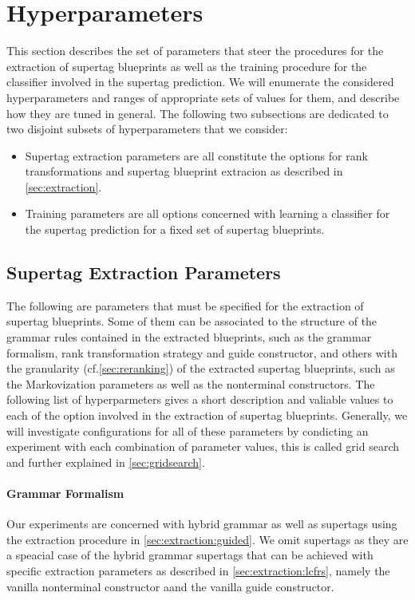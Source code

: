 \documentclass[../../document.tex]{subfiles}
\begin{document}
    \section{Hyperparameters}
    This section describes the set of parameters that steer the procedures for the extraction of supertag blueprints as well as the training procedure for the classifier involved in the supertag prediction.
    We will enumerate the considered hyperparameters and ranges of appropriate sets of values for them, and describe how they are tuned in general.
    The following two subsections are dedicated to two disjoint subsets of hyperparameters that we consider:
    \begin{itemize}
        \item Supertag extraction parameters are all constitute the options for rank transformations and supertag blueprint extracion as described in \cref{sec:extraction}.
        \item Training parameters are all options concerned with learning a classifier for the supertag prediction for a fixed set of supertag blueprints.
    \end{itemize}

    \subsection{Supertag Extraction Parameters}
    The following are parameters that must be specified for the extraction of supertag blueprints.
    Some of them can be associated to the structure of the grammar rules contained in the extracted blueprints, such as the grammar formalism, rank transformation strategy and guide constructor, and others with the granularity (cf.\@ \cref{sec:reranking}) of the extracted supertag blueprints, such as the Markovization parameters as well as the nonterminal constructors.
    The following list of hyperparmeters gives a short description and valiable values to each of the option involved in the extraction of supertag blueprints.
    Generally, we will investigate configurations for all of these parameters by condicting an experiment with each combination of parameter values, this is called grid search and further explained in \cref{sec:gridsearch}.
    
    \paragraph*{Grammar Formalism}
    Our experiments are concerned with hybrid grammar as well as  supertags using the extraction procedure in \cref{sec:extraction:guided}.
    We omit  supertags as they are a speacial case of the hybrid grammar supertags that can be achieved with specific extraction parameters as described in \cref{sec:extraction:lcfrs}, namely the vanilla nonterminal constructor aand the vanilla guide constructor.
\end{document}
